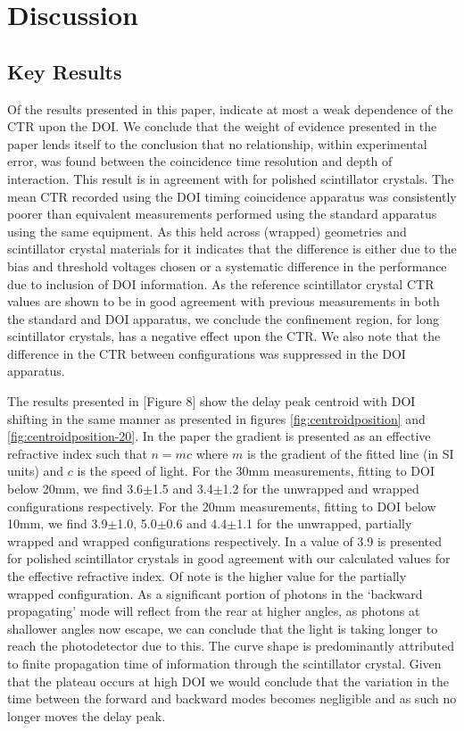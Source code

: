 \section{Discussion}
\label{sec:discussion}
\subsection{Key Results}
Of the results presented in this paper, indicate at most a weak dependence of the CTR upon the DOI. We conclude that the weight of evidence presented in the paper lends itself to the conclusion that no relationship, within experimental error, was found between the coincidence time resolution and depth of interaction. This result is in agreement with \cite{Bircher_Shao_2012} for polished scintillator crystals. The mean CTR recorded using the DOI timing coincidence apparatus was consistently poorer than equivalent measurements performed using the standard apparatus using the same equipment. As this held across (wrapped) geometries and scintillator crystal materials for it indicates that the difference is either due to the bias and threshold voltages chosen or a systematic difference in the performance due to inclusion of DOI information. As the reference scintillator crystal CTR values are shown to be in good agreement with previous measurements in both the standard and DOI apparatus, we conclude the confinement region, for long scintillator crystals, has a negative effect upon the CTR. We also note that the difference in the CTR between configurations was suppressed in the DOI apparatus.

The results presented in [Figure 8]\cite{Moses_Derenzo_1999} show the delay peak centroid with DOI shifting in the same manner as presented in figures \ref{fig:centroidposition} and \ref{fig:centroidposition-20}. In the paper the gradient is presented as an effective refractive index such that $n=mc$ where $m$ is the gradient of the fitted line (in SI units) and $c$ is the speed of light. For the 30mm measurements, fitting to DOI below 20mm, we find 3.6$\pm$1.5 and 3.4$\pm$1.2 for the unwrapped and wrapped configurations respectively.  For the 20mm measurements, fitting to DOI below 10mm, we find 3.9$\pm$1.0, 5.0$\pm$0.6 and 4.4$\pm$1.1 for the unwrapped, partially wrapped and wrapped configurations respectively. In \cite{Moses_Derenzo_1999} a value of 3.9 is presented for polished scintillator crystals in good agreement with our calculated values for the effective refractive index. Of note is the higher value for the partially wrapped configuration. As a significant portion of photons in the `backward propagating' mode will reflect from the rear at higher angles, as photons at shallower angles now escape, we can conclude that the light is taking longer to reach the photodetector due to this. The curve shape is predominantly attributed to finite propagation time of information through the scintillator crystal. Given that the plateau occurs at high DOI we would conclude that the variation in the time between the forward and backward modes becomes negligible and as such no longer moves the delay peak.

